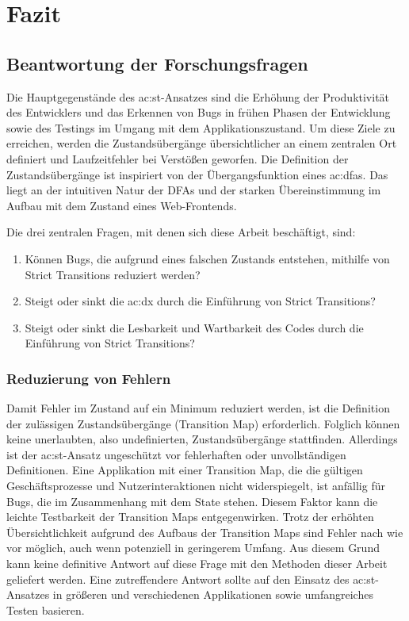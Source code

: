 \chapter{Fazit} \label{ch:fazit}

\section{Beantwortung der Forschungsfragen}

Die Hauptgegenstände des \acrlong{ac:st}-Ansatzes sind die Erhöhung der Produktivität des Entwicklers und das Erkennen von Bugs in frühen Phasen der Entwicklung sowie des Testings im Umgang mit dem Applikationszustand. Um diese Ziele zu erreichen, werden die Zustandsübergänge übersichtlicher an einem zentralen Ort definiert und Laufzeitfehler bei Verstößen geworfen. Die Definition der Zustandsübergänge ist inspiriert von der Übergangsfunktion eines \acrshort{ac:dfa}s. Das liegt an der intuitiven Natur der DFAs und der starken Übereinstimmung im Aufbau mit dem Zustand eines Web-Frontends.

Die drei zentralen Fragen, mit denen sich diese Arbeit beschäftigt, sind:

\begin{enumerate}
  \item Können Bugs, die aufgrund eines falschen Zustands entstehen, mithilfe von Strict Transitions reduziert werden?
  \item Steigt oder sinkt die \acrshort{ac:dx} durch die Einführung von Strict Transitions?
  \item Steigt oder sinkt die Lesbarkeit und Wartbarkeit des Codes durch die Einführung von Strict Transitions?
\end{enumerate}

\subsection{Reduzierung von Fehlern}

Damit Fehler im Zustand auf ein Minimum reduziert werden, ist die Definition der zulässigen Zustandsübergänge (Transition Map) erforderlich. Folglich können keine unerlaubten, also undefinierten, Zustandsübergänge stattfinden. Allerdings ist der \acrshort{ac:st}-Ansatz ungeschützt vor fehlerhaften oder unvollständigen Definitionen. Eine Applikation mit einer Transition Map, die die gültigen Geschäftsprozesse und Nutzerinteraktionen nicht widerspiegelt, ist anfällig für Bugs, die im Zusammenhang mit dem State stehen. Diesem Faktor kann die leichte Testbarkeit der Transition Maps entgegenwirken. Trotz der erhöhten Übersichtlichkeit aufgrund des Aufbaus der Transition Maps sind Fehler nach wie vor möglich, auch wenn potenziell in geringerem Umfang. Aus diesem Grund kann keine definitive Antwort auf diese Frage mit den Methoden dieser Arbeit geliefert werden. Eine zutreffendere Antwort sollte auf den Einsatz des \acrshort{ac:st}-Ansatzes in größeren und verschiedenen Applikationen sowie umfangreiches Testen basieren.


